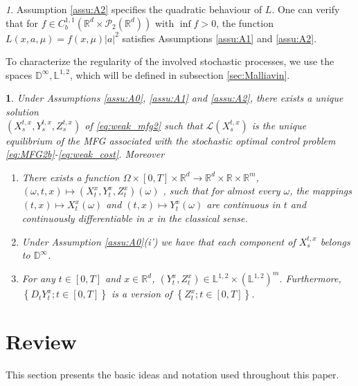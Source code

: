 \documentclass[12,english]{amsart}
\theoremstyle{plain}
\newtheorem{thm}{\protect\theoremname}
\theoremstyle{definition}
\theoremstyle{plain}
\theoremstyle{plain}
\theoremstyle{remark}
\newtheorem{rem}{\protect\remarkname}
\providecommand{\remarkname}{Remark}
\providecommand{\theoremname}{Theorem}
\newcommand{\D}{\mathbb D}
\newcommand{\R}{\mathbb R}
\newcommand{\cL}{\mathcal L}
\newcommand{\cP}{\mathcal P}
\newcommand{\om}{\omega}
\newcommand{\mL}{\mathbb L}
\begin{document}
\begin{rem}
  Assumption \ref{assu:A2} specifies the quadratic behaviour of $L$.
  One can verify that for $f\in C_b^{1,1}(\R^d\times\cP_2(\R^d))$
  with $\inf f>0$, 
 the function $L(x,a,\mu)=f(x,\mu)|a|^2$ satisfies Assumptions \ref{assu:A1} and \ref{assu:A2}.
\end{rem}



To characterize the regularity of the involved stochastic
processes, we use the spaces $\D^{\infty}, \mL^{1,2}$, which
will be defined in subsection \ref{sec:Malliavin}.



\begin{thm}\label{thm:weak_MFG}
  Under Assumptions \ref{assu:A0}, \ref{assu:A1} and
  \ref{assu:A2}, there exists  
a unique solution \\ $(X^{t,x}_s,Y^{t,x}_s,Z^{t,x}_s)$ of \eqref{eq:weak_mfg2}
such that $\cL(X^{t,x}_s)$
is the unique equilibrium of the MFG associated with the stochastic
optimal control problem
\eqref{eq:MFG2b}-\eqref{eq:weak_cost}. Moreover

\begin{enumerate}
  \item 
    There exists a function
$\Omega\times\left[0,T\right]\times\R^d\to\R^d\times\R\times\R^m$,
$(\omega,t,x)\mapsto(X_t^x,Y_t^x,Z_t^x)(\omega)$
, such that for almost every $\omega$, the mappings $(t,x)\mapsto X_t^x(\om)$
and $(t,x)\mapsto Y_t^x(\om)$ are continuous in $t$ and
continuously differentiable in $x$ in the classical sense.

\item Under Assumption \ref{assu:A0}(i') we have that  each component
  of $X^{t,x}_s$ belongs to $\D^{\infty}$.

\item For any $t\in\left[0,T\right]$ and $x\in\R^d$, $(Y_t^x,Z_t^x)\in\mL^{1,2}\times(\mL^{1,2})^m$.
Furthermore, $\left\{ D_tY_t^x;t\in\left[0,T\right]\right\} $
is a version of $\left\{ Z_t^x;t\in\left[0,T\right]\right\} $.

\end{enumerate}
\end{thm}

\section{Review}\label{sec:Preliminaries} 

This section presents the basic ideas and notation used throughout this paper. 
\end{document}
